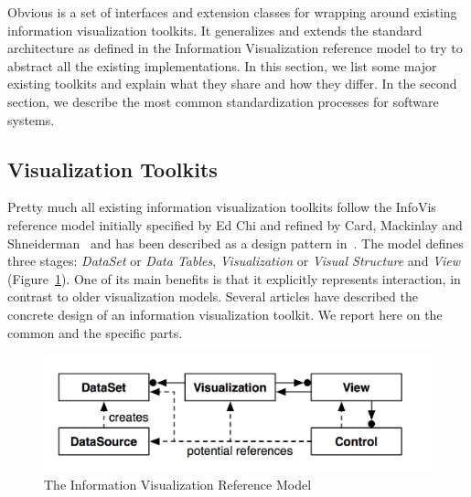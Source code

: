 Obvious is a set of interfaces and extension classes for wrapping
around existing information visualization toolkits.  It generalizes
and extends the standard architecture as defined in the Information
Visualization reference model to try to abstract all the existing
implementations.  In this section, we list some major existing
toolkits and explain what they share and how they differ.  In the
second section, we describe the most common standardization processes
for software systems.

\subsection{Visualization Toolkits}

Pretty much all existing information visualization toolkits follow the
InfoVis reference model initially specified by Ed Chi and refined by
Card, Mackinlay and Shneiderman~\cite{ChiRefModel,ReadingsIV} and has
been described as a design pattern in~\cite{DesignPatternsIV}.  The
model defines three stages: \emph{DataSet} or \emph{Data Tables},
\emph{Visualization} or \emph{Visual Structure} and \emph{View}
(Figure~\ref{fig:refmodel}).  One of its main benefits is that it
explicitly represents interaction, in contrast to older visualization
models.  Several articles have described the concrete design of an
information visualization toolkit.  We report here on the common and
the specific parts.

\begin{figure}
\includegraphics[width=\columnwidth]{figures/refmodpat}
\caption{The Information Visualization Reference Model~\cite{DesignPatternsIV}}
\label{fig:refmodel}
\end{figure}


